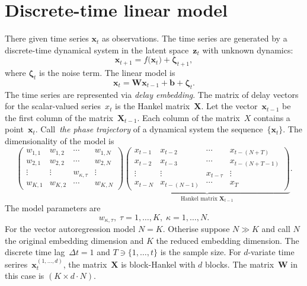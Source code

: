 \documentclass[12pt]{article}
\begin{document}
\section{Discrete-time linear model}
There given time series $\mathbf{x}_t$ as observations.
The time series are generated by a discrete-time dynamical system in the latent space~$\mathbf{z}_t$ with unknown dynamics:
\begin{equation}\label{eq:linear-model}
    \mathbf{x}_{t+1} = f\bigl(\mathbf{x}_t\bigr)  + \boldsymbol{\zeta}_{t+1},
\end{equation}
where $\boldsymbol{\zeta}_{t}$ is the noise term.
The linear model is
\[
   \mathbf{x}_t = \mathbf{W}\mathbf{x}_{t-1} +\mathbf{b} + \boldsymbol{\zeta}_{t}.
\]
The time series are represented via \emph{delay embedding}.
The matrix of delay vectors for the scalar-valued series~$x_t$ is the Hankel matrix~$\mathbf{X}$.
Let the vector~$\mathbf{x}_{t-1}$ be the first column of the matrix~$\mathbf{X}_{t-1}$.
Each column of the matrix~$X$ contains a point~$\mathbf{x}_t$.
Call~\emph{the phase trajectory} of a dynamical system the sequence~$\{\mathbf{x}_t\}$.
The dimensionality of the model is
\[
    \begin{pmatrix}
        w_{1,1} & w_{1,2} & \cdots & w_{1,N} \\
        w_{2,1} & w_{2,2} & \cdots & w_{2,N} \\
        \vdots  & \vdots  & w_{\kappa,\tau} & \vdots  \\
        w_{K,1} & w_{K,2} & \cdots & w_{K,N}
    \end{pmatrix}
    \underbrace{
    \begin{pmatrix}
        x_{t-1} & x_{t-2} & \cdots & x_{t-(N+T)} \\
        x_{t-2} & x_{t-3} & \cdots & x_{t-(N+T-1)} \\
        \vdots & \vdots & x_{t-\tau} & \vdots \\
        x_{t-N} & x_{t-(N-1)} & \cdots & x_{T}
    \end{pmatrix}}_{\text{Hankel matrix }\mathbf{X}_{t-1}}.
\]
The model parameters are
\[
w_{\kappa,\tau},\;
\tau=1,\dots,K,\;
\kappa=1,\dots,N.
\]
For the vector autoregression model $N=K$.
Otherise suppose $N\gg K$ and call $N$ the original embedding dimension and $K$ the reduced embedding dimension.
The discrete time lag~$\Delta t = 1$ and $T\ni\{1,\dots,t\}$ is the sample size.
For $d$-variate time serires~$\mathbf{x}_t^{(1,\dots,d)}$, the matrix~$\mathbf{X}$ is block-Hankel with $d$ blocks.
The matrix~$\mathbf{W}$ in this case is $(K\times d\cdot N)$.
\end{document}
